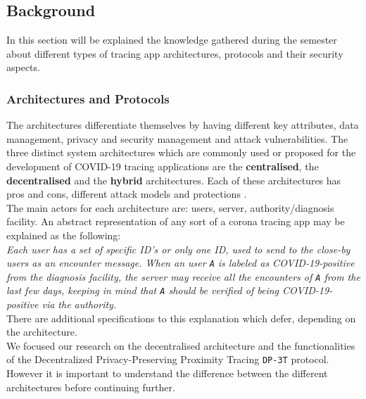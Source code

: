 \documentclass[a4paper, twocolumn]{article}
\begin{document}
\subsection{Background}
In this section will be explained the knowledge gathered during the semester about different types of tracing app architectures, protocols and their security aspects.
\subsubsection{Architectures and Protocols}
The architectures differentiate themselves by having different key attributes, data management, privacy and security management and attack vulnerabilities. The three distinct system architectures which are commonly used or proposed for the development of COVID-19 tracing applications are the  \textbf{centralised}, the \textbf{decentralised} and the \textbf{hybrid} architectures. Each of these architectures has pros and cons, different attack models and protections \cite{survey}.\\
The main actors for each architecture are: users, server, authority/diagnosis facility. An abstract representation of any sort of a corona tracing app may be explained as the following:\\
\textit{Each user has a set of specific ID's or only one ID, used to send to the close-by users as an encounter message. When an user \texttt{A} is labeled as COVID-19-positive from the diagnosis facility, the server may receive all the encounters of \texttt{A} from the last few days, keeping in mind that \texttt{A} should be verified of being COVID-19-positive via the authority.}\\

\noindent There are additional specifications to this explanation which defer, depending on the architecture.\\
We focused our research on the decentralised architecture and the functionalities of the Decentralized Privacy-Preserving Proximity Tracing \texttt{DP-3T} protocol. However it is important to understand the difference between the different architectures before continuing further.\\
\end{document}
